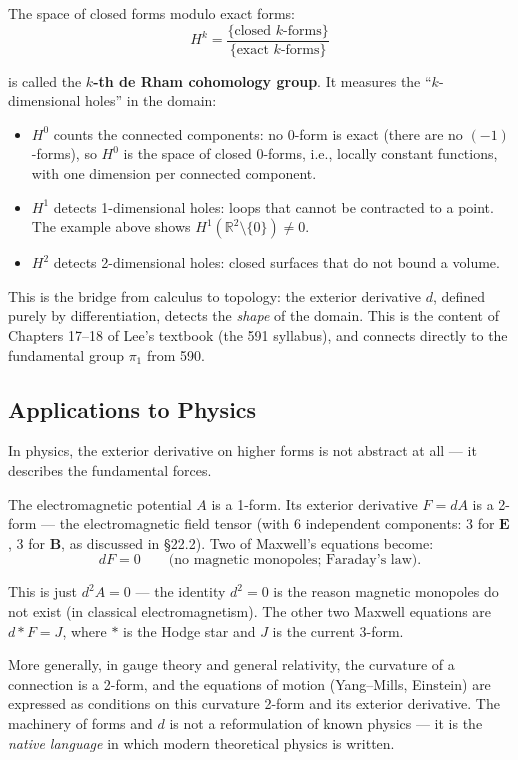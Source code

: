 \documentclass[11pt]{report}
\newcommand{\R}{\mathbb{R}}
\begin{document}
The space of closed forms modulo exact forms:
\[
H^k = \frac{\{\text{closed } k\text{-forms}\}}{\{\text{exact } k\text{-forms}\}}
\]

is called the \textbf{$k$-th de Rham cohomology group}. It measures the ``$k$-dimensional holes'' in the domain:
\begin{itemize}
    \item $H^0$ counts the connected components: no 0-form is exact (there are no $(-1)$-forms), so $H^0$ is the space of closed 0-forms, i.e., locally constant functions, with one dimension per connected component.
    \item $H^1$ detects 1-dimensional holes: loops that cannot be contracted to a point. The example above shows $H^1(\R^2 \setminus \{0\}) \neq 0$.
    \item $H^2$ detects 2-dimensional holes: closed surfaces that do not bound a volume.
\end{itemize}

This is the bridge from calculus to topology: the exterior derivative $d$, defined purely by differentiation, detects the \textit{shape} of the domain. This is the content of Chapters 17--18 of Lee's textbook (the 591 syllabus), and connects directly to the fundamental group $\pi_1$ from 590.

\subsection{Applications to Physics}

In physics, the exterior derivative on higher forms is not abstract at all --- it describes the fundamental forces.

The electromagnetic potential $A$ is a 1-form. Its exterior derivative $F = dA$ is a 2-form --- the electromagnetic field tensor (with 6 independent components: 3 for $\mathbf{E}$, 3 for $\mathbf{B}$, as discussed in \S22.2). Two of Maxwell's equations become:
\[
dF = 0 \qquad \text{(no magnetic monopoles; Faraday's law)}.
\]

This is just $d^2A = 0$ --- the identity $d^2 = 0$ is the reason magnetic monopoles do not exist (in classical electromagnetism). The other two Maxwell equations are $d{*}F = J$, where $*$ is the Hodge star and $J$ is the current 3-form.

More generally, in gauge theory and general relativity, the curvature of a connection is a 2-form, and the equations of motion (Yang--Mills, Einstein) are expressed as conditions on this curvature 2-form and its exterior derivative. The machinery of forms and $d$ is not a reformulation of known physics --- it is the \textit{native language} in which modern theoretical physics is written.
\end{document}
